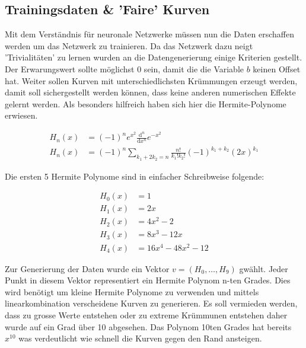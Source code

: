 	
	\subsection{Trainingsdaten \& 'Faire' Kurven}
	Mit dem Verständnis für neuronale Netzwerke müssen nun die Daten erschaffen werden um das Netzwerk zu trainieren. Da das Netzwerk dazu neigt 'Trivialitäten' zu lernen wurden an die Datengenerierung einige Kriterien gestellt. Der Erwarungswert sollte möglichst 0 sein, damit die die Variable $b$ keinen Offset hat. Weiter sollen Kurven mit unterschiedlichsten Krümmungen erzeugt werden, damit soll sichergestellt werden können, dass keine anderen numerischen Effekte gelernt werden. Als besonders hilfreich haben sich hier die Hermite-Polynome erwiesen.
	
	\begin{align}
		H_{n}(x) &=(-1)^{n}e^{x^{2}}{\frac {\mathrm {d} ^{n}}{\mathrm {d} x^{n}}}e^{-x^{2}} \\
		H_{n}(x) &=(-1)^{n}\sum _{k_{1}+2k_{2}=n}{\frac {n!}{k_{1}!k_{2}!}}(-1)^{k_{1}+k_{2}}(2x)^{k_{1}}
	\end{align}
	
	Die ersten 5 Hermite Polynome sind in einfacher Schreibweise folgende:
	
	\begin{align}
	H_{0}(x) &= 1\\
	H_{1}(x) &= 2x\\
	H_{2}(x) &= 4x^{2}-2\\
	H_{3}(x) &= 8x^{3}-12x\\
	H_{4}(x) &= 16x^{4}-48x^{2}-12
	\end{align}
	
	Zur Generierung der Daten wurde ein Vektor $v=(H_0, \dots ,H_9)$ gwählt. Jeder Punkt in diesem Vektor representiert ein Hermite Polynom n-ten Grades. Dies wird benötigt um kleine Hermite Polynome zu verwenden und mittels linearkombination verscheidene Kurven zu generieren. Es soll vermieden werden, dass zu grosse Werte entstehen oder zu extreme Krümmunen entstehen daher wurde auf ein Grad über 10 abgesehen. Das Polynom 10ten Grades hat bereits $x^{10}$ was verdeutlicht wie schnell die Kurven gegen den Rand ansteigen.
	
